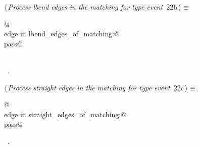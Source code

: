\documentclass[10pt, english, oneside]{report}
\begin{document}
\begin{flushleft} \small
\begin{minipage}{\linewidth}\label{scrap25}\raggedright\small
{} $\langle\,${\itshape Process lbend edges in the matching for type  event}\nobreak\ {\footnotesize {22b}}$\,\rangle\equiv$
\vspace{-1ex}
\begin{list}{}{} \item
\mbox{}\verb@   @\\
\mbox{}\verb@for edge in lbend_edges_of_matching:@\\
\mbox{}\verb@        pass@\\
\mbox{}\verb@@\\
\mbox{}\verb@@{\NWsep}
\end{list}
\vspace{-1.5ex}
\footnotesize
\begin{list}{}{\setlength{\itemsep}{-\parsep}\setlength{\itemindent}{-\leftmargin}}
\item \NWtxtMacroRefIn\ .

\item{}
\end{list}
\end{minipage}\vspace{4ex}
\end{flushleft}


\begin{flushleft} \small
\begin{minipage}{\linewidth}\label{scrap26}\raggedright\small
{} $\langle\,${\itshape Process straight edges in the matching for type  event}\nobreak\ {\footnotesize {22c}}$\,\rangle\equiv$
\vspace{-1ex}
\begin{list}{}{} \item
\mbox{}\verb@   @\\
\mbox{}\verb@for edge in straight_edges_of_matching:@\\
\mbox{}\verb@      pass@\\
\mbox{}\verb@@{\NWsep}
\end{list}
\vspace{-1.5ex}
\footnotesize
\begin{list}{}{\setlength{\itemsep}{-\parsep}\setlength{\itemindent}{-\leftmargin}}
\item \NWtxtMacroRefIn\ .

\item{}
\end{list}
\end{minipage}\vspace{4ex}
\end{flushleft}
\end{document}
